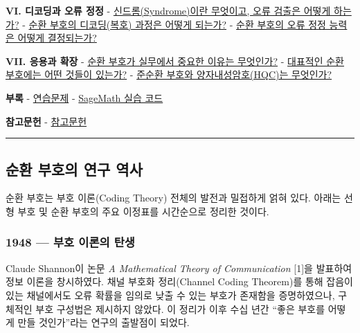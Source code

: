 \documentclass[
  oneside]{article}
\begin{document}
\textbf{VI. 디코딩과 오류 정정} -
\hyperref[uxc2e0uxb4dcuxb86csyndromeuxc774uxb780-uxbb34uxc5c7uxc774uxace0-uxc624uxb958-uxac80uxcd9cuxc740-uxc5b4uxb5bbuxac8c-uxd558uxb294uxac00]{신드롬(Syndrome)이란
무엇이고, 오류 검출은 어떻게 하는가?} -
\hyperref[uxc21cuxd658-uxbd80uxd638uxc758-uxb514uxcf54uxb529uxbcf5uxd638-uxacfcuxc815uxc740-uxc5b4uxb5bbuxac8c-uxb418uxb294uxac00]{순환
부호의 디코딩(복호) 과정은 어떻게 되는가?} -
\hyperref[uxc21cuxd658-uxbd80uxd638uxc758-uxc624uxb958-uxc815uxc815-uxb2a5uxb825uxc740-uxc5b4uxb5bbuxac8c-uxacb0uxc815uxb418uxb294uxac00]{순환
부호의 오류 정정 능력은 어떻게 결정되는가?}

\textbf{VII. 응용과 확장} -
\hyperref[uxc21cuxd658-uxbd80uxd638uxac00-uxc2e4uxbb34uxc5d0uxc11c-uxc911uxc694uxd55c-uxc774uxc720uxb294-uxbb34uxc5c7uxc778uxac00]{순환
부호가 실무에서 중요한 이유는 무엇인가?} -
\hyperref[uxb300uxd45cuxc801uxc778-uxc21cuxd658-uxbd80uxd638uxc5d0uxb294-uxc5b4uxb5a4-uxac83uxb4e4uxc774-uxc788uxb294uxac00]{대표적인
순환 부호에는 어떤 것들이 있는가?} -
\hyperref[uxc900uxc21cuxd658-uxbd80uxd638uxc640-uxc591uxc790uxb0b4uxc131uxc554uxd638hqcuxb294-uxbb34uxc5c7uxc778uxac00]{준순환
부호와 양자내성암호(HQC)는 무엇인가?}

\textbf{부록} - \hyperref[uxc5f0uxc2b5uxbb38uxc81c]{연습문제} -
\hyperref[sagemath-uxc2e4uxc2b5-uxcf54uxb4dc]{SageMath 실습 코드}

\textbf{참고문헌} - \hyperref[uxcc38uxace0uxbb38uxd5cc]{참고문헌}

\begin{center}\rule{0.5\linewidth}{0.5pt}\end{center}

\subsection{순환 부호의 연구
역사}\label{uxc21cuxd658-uxbd80uxd638uxc758-uxc5f0uxad6c-uxc5eduxc0ac}

순환 부호는 부호 이론(Coding Theory) 전체의 발전과 밀접하게 얽혀 있다.
아래는 선형 부호 및 순환 부호의 주요 이정표를 시간순으로 정리한 것이다.

\subsubsection{1948 --- 부호 이론의
탄생}\label{uxbd80uxd638-uxc774uxb860uxc758-uxd0c4uxc0dd}

Claude Shannon이 논문 \emph{A Mathematical Theory of Communication}
{[}1{]}을 발표하여 정보 이론을 창시하였다. 채널 부호화 정리(Channel
Coding Theorem)를 통해 잡음이 있는 채널에서도 오류 확률을 임의로 낮출 수
있는 부호가 존재함을 증명하였으나, 구체적인 부호 구성법은 제시하지
않았다. 이 정리가 이후 수십 년간 ``좋은 부호를 어떻게 만들 것인가''라는
연구의 출발점이 되었다.
\end{document}
